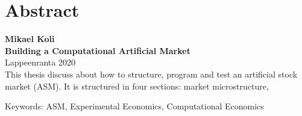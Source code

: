 \section*{Abstract}

\textbf{Mikael Koli}\\
\textbf{Building a Computational Artificial Market}\\
Lappeenranta 2020\\


This thesis discuss about how to structure, program
and test an artificial stock market (ASM). It is structured
in four sections: market microstructure, 

Keywords: ASM, Experimental Economics, Computational Economics\\
